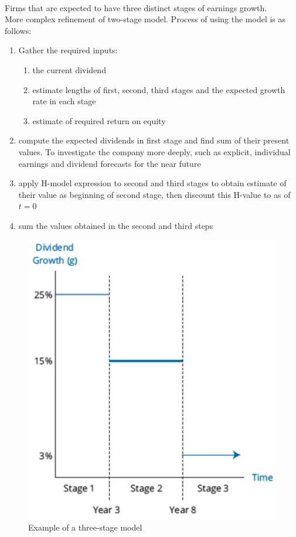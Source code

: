 \begin{method} \\
Firms that are expected to have three distinct stages of earnings growth.\\
More complex refinement of two-stage model. Process of using the model is as follows:
\begin{enumerate}[label=\roman*.]
\setlength{\itemsep}{0pt}
\item Gather the required inputs:
\begin{enumerate}[label=\arabic*.]
\setlength{\itemsep}{0pt}
\item the current dividend
\item estimate lengths of first, second, third stages and the expected growth rate in each stage
\item estimate of required return on equity
\end{enumerate}
\item compute the expected dividends in first stage and find sum of their present values. To investigate the company more deeply, such as explicit, individual earnings and dividend forecasts for the near future
\item apply H-model expression to second and third stages to obtain estimate of their value as beginning of second stage, then discount this H-value to as of $t=0$
\item sum the values obtained in the second and third steps
\end{enumerate}
\end{method}

\begin{figure}[H]
\centering
\includegraphics[scale=0.4]{images/equity/threestage}
\caption{Example of a three-stage model}
\end{figure}

